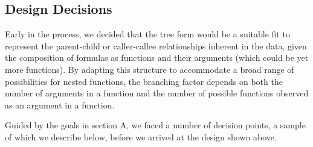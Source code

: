 \documentclass[conference]{IEEEtran}
\begin{document}
\subsection{Design Decisions}
Early in the process, we decided that the tree form would be a suitable fit to represent the parent-child or caller-callee relationships inherent in the data, given the composition of formulas as functions and their arguments (which could be yet more functions). By adapting this structure to accommodate a broad range of possibilities for nested functions, the branching factor depends on both the number of arguments in a function and the number of possible functions observed as an argument in a function. \par
Guided by the goals in section A, we faced a number of decision points, a sample of which we describe below, before we arrived at the design shown above.
\end{document}
